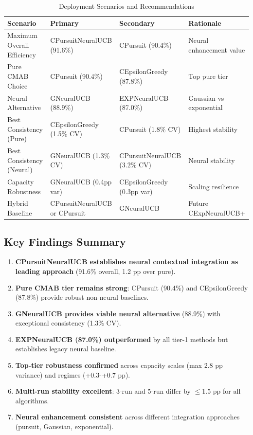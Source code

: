 \documentclass[12pt,a4paper]{article}
\newcommand{\performance}[1]{\textcolor{performancecolor}{\textbf{#1}}}
\newcommand{\success}[1]{\textcolor{successcolor}{\textbf{#1}}}
\newcommand{\legacy}[1]{\textcolor{legacycolor}{\textbf{#1}}}
\newcommand{\neural}[1]{\textcolor{neuralcolor}{\textbf{#1}}}
\begin{document}
\begin{table}[H]
\small
\centering
\caption{Deployment Scenarios and Recommendations}
\begin{tabular}{|l|l|l|l|}
\hline
\textbf{Scenario} & \textbf{Primary} & \textbf{Secondary} & \textbf{Rationale} \\
\hline
\hline
Maximum Overall Efficiency & CPursuitNeuralUCB (91.6\%) & CPursuit (90.4\%) & Neural enhancement value \\
Pure CMAB Choice & CPursuit (90.4\%) & CEpsilonGreedy (87.8\%) & Top pure tier \\
Neural Alternative & GNeuralUCB (88.9\%) & EXPNeuralUCB (87.0\%) & Gaussian vs exponential \\
Best Consistency (Pure) & CEpsilonGreedy (1.5\% CV) & CPursuit (1.8\% CV) & Highest stability \\
Best Consistency (Neural) & GNeuralUCB (1.3\% CV) & CPursuitNeuralUCB (3.2\% CV) & Neural stability \\
Capacity Robustness & GNeuralUCB (0.4pp var) & CEpsilonGreedy (0.3pp var) & Scaling resilience \\
Hybrid Baseline & CPursuitNeuralUCB or CPursuit & GNeuralUCB & Future CExpNeuralUCB+ \\
\hline
\end{tabular}
\end{table}

\subsection{Key Findings Summary}

\begin{enumerate}
\item \neural{CPursuitNeuralUCB establishes neural contextual integration as leading approach} (91.6\% overall, 1.2 pp over pure).
\item \performance{Pure CMAB tier remains strong}: CPursuit (90.4\%) and CEpsilonGreedy (87.8\%) provide robust non-neural baselines.
\item \neural{GNeuralUCB provides viable neural alternative} (88.9\%) with exceptional consistency (1.3\% CV).
\item \legacy{EXPNeuralUCB (87.0\%) outperformed} by all tier-1 methods but establishes legacy neural baseline.
\item \success{Top-tier robustness confirmed} across capacity scales (max 2.8 pp variance) and regimes (+0.3\--+0.7 pp).
\item \success{Multi-run stability excellent}: 3-run and 5-run differ by $\leq$1.5 pp for all algorithms.
\item \neural{Neural enhancement consistent} across different integration approaches (pursuit, Gaussian, exponential).
\end{enumerate}
\end{document}
